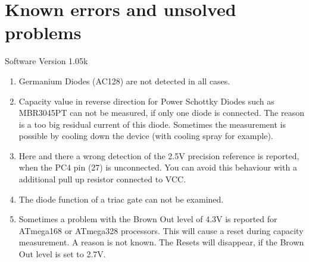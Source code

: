 
\chapter{Known errors and unsolved problems}
{\center Software Version 1.05k}

\begin{enumerate}

\item Germanium Diodes (AC128) are not detected in all cases.

\item Capacity value in reverse direction for Power Schottky Diodes such as MBR3045PT can not be measured,
if only one diode is connected. The reason is a too big residual current of this diode.
Sometimes the measurement is possible by cooling down the device (with  cooling spray for example).

\item Here and there  a wrong detection of the 2.5V precision reference is reported, when the PC4 pin (27) is unconnected.
You can avoid this behaviour with a additional pull up resistor connected to VCC.

\item The diode function of a triac gate can not be examined.

\item Sometimes a problem with the Brown Out level of 4.3V is reported for ATmega168 or ATmega328 processors.
This will cause a reset during capacity measurement. A reason is not known.
The Resets will disappear, if the Brown Out level is set to 2.7V.

\end{enumerate}

